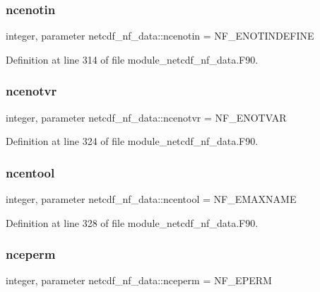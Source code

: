 \subsubsection{\texorpdfstring{ncenotin}{ncenotin}}
{\footnotesize\ttfamily integer, parameter netcdf\+\_\+nf\+\_\+data\+::ncenotin = N\+F\+\_\+\+E\+N\+O\+T\+I\+N\+D\+E\+F\+I\+NE}



Definition at line 314 of file module\+\_\+netcdf\+\_\+nf\+\_\+data.\+F90.

\mbox{\label{namespacenetcdf__nf__data_a95cc359e752fa7c1a3d304f5106e8b68}} 
\subsubsection{\texorpdfstring{ncenotvr}{ncenotvr}}
{\footnotesize\ttfamily integer, parameter netcdf\+\_\+nf\+\_\+data\+::ncenotvr = N\+F\+\_\+\+E\+N\+O\+T\+V\+AR}



Definition at line 324 of file module\+\_\+netcdf\+\_\+nf\+\_\+data.\+F90.

\mbox{\label{namespacenetcdf__nf__data_aa9bc47547a7261640aebf2e20f967866}} 
\subsubsection{\texorpdfstring{ncentool}{ncentool}}
{\footnotesize\ttfamily integer, parameter netcdf\+\_\+nf\+\_\+data\+::ncentool = N\+F\+\_\+\+E\+M\+A\+X\+N\+A\+ME}



Definition at line 328 of file module\+\_\+netcdf\+\_\+nf\+\_\+data.\+F90.

\mbox{\label{namespacenetcdf__nf__data_a2b1b6addf2f81da54af71f390068562a}} 
\subsubsection{\texorpdfstring{nceperm}{nceperm}}
{\footnotesize\ttfamily integer, parameter netcdf\+\_\+nf\+\_\+data\+::nceperm = N\+F\+\_\+\+E\+P\+E\+RM}



